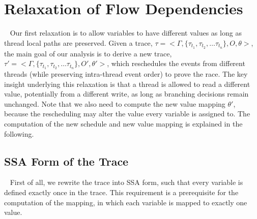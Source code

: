 \section{Relaxation of Flow Dependencies}~\label{sec:relax1}
Our first relaxation is to allow variables to have different values 
as long as thread local paths are preserved.
Given a trace, $\tau=<\Gamma , \{\tau_{t_1}, \tau_{t_2}, \dots \tau_{t_n} \}, 
O, \theta>$, the main goal of our analysis is to derive a new trace,
  $\tau'=<\Gamma , \{\tau_{t_1}, \tau_{t_2}, \dots \tau_{t_n} \}, O', \theta'>$,
 which reschedules the events from different threads (while preserving 
intra-thread event order) to prove the race. The key insight underlying 
this relaxation is that a thread is allowed to read a different value, 
potentially from a different write, as long as branching decisions 
remain unchanged. Note that we also need to compute the new value 
mapping $\theta'$, because the rescheduling may alter the value every 
variable is assigned to. The computation of the new schedule and new value 
mapping is explained in the following.







\subsection{SSA Form of the Trace}~\label{sec:ssa}
First of all, we rewrite the trace into SSA form, such that every variable is
defined exactly once in the trace. This requirement is a prerequisite for 
the computation of the mapping, in which each variable is mapped to exactly 
one value. 

